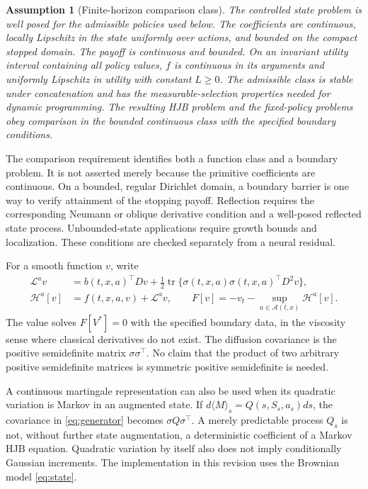 \documentclass[ecta,nameyear,draft]{econsocart}
\newtheorem{assumption}{Assumption}
\theoremstyle{definition}
\theoremstyle{remark}
\newcommand{\HH}{\mathcal H}
\newcommand{\LL}{\mathcal L}
\newcommand{\Act}{\mathcal A}
\newcommand{\tr}{\operatorname{tr}}
\begin{document}
\begin{assumption}[Finite-horizon comparison class]\label{ass:model}
The controlled state problem is well posed for the admissible policies used below. The coefficients are continuous, locally Lipschitz in the state uniformly over actions, and bounded on the compact stopped domain. The payoff is continuous and bounded. On an invariant utility interval containing all policy values, $f$ is continuous in its arguments and uniformly Lipschitz in utility with constant $L\geq0$. The admissible class is stable under concatenation and has the measurable-selection properties needed for dynamic programming. The resulting HJB problem and the fixed-policy problems obey comparison in the bounded continuous class with the specified boundary conditions.
\end{assumption}

The comparison requirement identifies both a function class and a boundary problem. It is not asserted merely because the primitive coefficients are continuous. On a bounded, regular Dirichlet domain, a boundary barrier is one way to verify attainment of the stopping payoff. Reflection requires the corresponding Neumann or oblique derivative condition and a well-posed reflected state process. Unbounded-state applications require growth bounds and localization. These conditions are checked separately from a neural residual.

For a smooth function $v$, write
\begin{align}
 \LL^a v&=b(t,x,a)^\top Dv+\tfrac12\tr\{\sigma(t,x,a)\sigma(t,x,a)^\top D^2v\},\label{eq:generator}\\
 \HH^a[v]&=f(t,x,a,v)+\LL^a v,\qquad
 F[v]=-v_t-\sup_{a\in\Act(t,x)}\HH^a[v].\label{eq:hjb}
\end{align}
The value solves $F[V^*]=0$ with the specified boundary data, in the viscosity sense where classical derivatives do not exist. The diffusion covariance is the positive semidefinite matrix $\sigma\sigma^\top$. No claim that the product of two arbitrary positive semidefinite matrices is symmetric positive semidefinite is needed.

A continuous martingale representation can also be used when its quadratic variation is Markov in an augmented state. If $d\langle M\rangle_s=Q(s,S_s,a_s)ds$, the covariance in \eqref{eq:generator} becomes $\sigma Q\sigma^\top$. A merely predictable process $Q_s$ is not, without further state augmentation, a deterministic coefficient of a Markov HJB equation. Quadratic variation by itself also does not imply conditionally Gaussian increments. The implementation in this revision uses the Brownian model \eqref{eq:state}.
\end{document}
